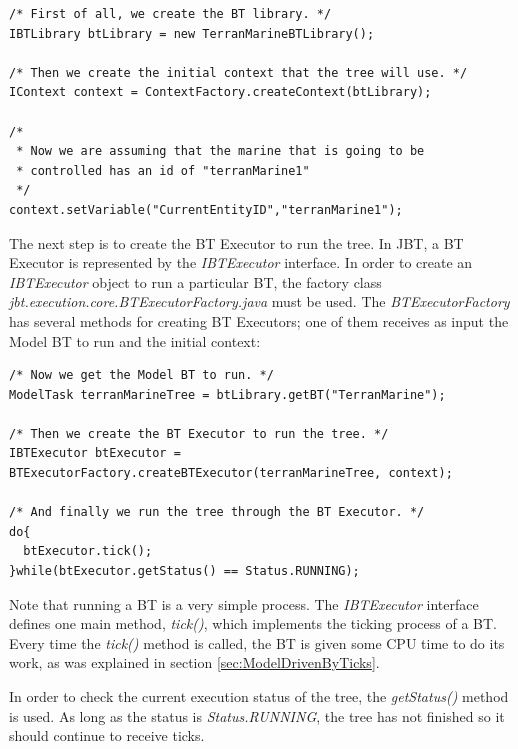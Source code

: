 \documentclass[a4paper]{article}
\begin{document}
\begin{verbatim}
/* First of all, we create the BT library. */
IBTLibrary btLibrary = new TerranMarineBTLibrary();

/* Then we create the initial context that the tree will use. */
IContext context = ContextFactory.createContext(btLibrary);

/* 
 * Now we are assuming that the marine that is going to be
 * controlled has an id of "terranMarine1"
 */
context.setVariable("CurrentEntityID","terranMarine1");
\end{verbatim}

The next step is to create the BT Executor to run the tree. In JBT, a BT Executor is represented by the \textit{IBTExecutor} interface. In order to create an \textit{IBTExecutor} object to run a particular BT, the factory class \textit{jbt.execution.core.BTExecutorFactory.java} must be used. The \textit{BTExecutorFactory} has several methods for creating BT Executors; one of them receives as input the Model BT to run and the initial context:

\begin{verbatim}
/* Now we get the Model BT to run. */
ModelTask terranMarineTree = btLibrary.getBT("TerranMarine");

/* Then we create the BT Executor to run the tree. */
IBTExecutor btExecutor = BTExecutorFactory.createBTExecutor(terranMarineTree, context);

/* And finally we run the tree through the BT Executor. */
do{
  btExecutor.tick();
}while(btExecutor.getStatus() == Status.RUNNING);
\end{verbatim}

Note that running a BT is a very simple process. The \textit{IBTExecutor} interface defines one main method, \textit{tick()}, which implements the ticking process of a BT. Every time the \textit{tick()} method is called, the BT is given some CPU time to do its work, as was explained in section \ref{sec:ModelDrivenByTicks}.

In order to check the current execution status of the tree, the \textit{getStatus()} method is used. As long as the status is \textit{Status.RUNNING}, the tree has not finished so it should continue to receive ticks.


\end{document}

